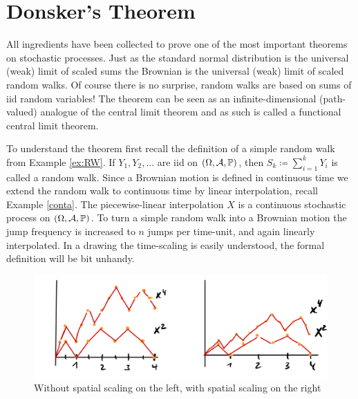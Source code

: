 \section{Donsker's Theorem}
All ingredients have been collected to prove one of the most important theorems on stochastic processes. Just as the standard normal distribution is the universal (weak) limit of scaled sums the Brownian is the universal (weak) limit of scaled random walks. Of course there is no surprise, random walks are based on sums of iid random variables! The theorem can be seen as an infinite-dimensional (path-valued) analogue of the central limit theorem and as such is called a functional central limit theorem. \smallskip

To understand the theorem first recall the definition of a simple random walk from Example \ref{ex:RW}. If $Y_1,Y_2,...$ are iid on $(\Omega,\mathcal{A},\mathbb{P})$, then $S_k \coloneqq \sum_{i=1}^k Y_i$ is called a random walk. Since a Brownian motion is defined in continuous time we extend the random walk to continuous time by linear interpolation, recall Example \ref{conta}. The piecewise-linear interpolation $X$ is a continuous stochastic process on $(\Omega,\mathcal{A},\mathbb{P})$. To turn a simple random walk into a Brownian motion the jump frequency is increased to $n$ jumps per time-unit, and again linearly interpolated. In a drawing the time-scaling is easily understood, the formal definition will be bit unhandy.
\begin{figure}[h]
	\begin{center}
		\includegraphics[scale=0.13]{scaling2.jpeg}
	\end{center}
	\caption*{Without spatial scaling on the left, with spatial scaling on the right}
	\end{figure}

